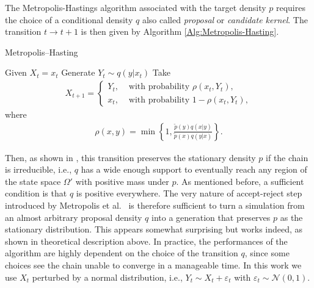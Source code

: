 \documentclass[11pt,a4paper]{article}
\numberwithin{equation}{section}
\begin{document}
The Metropolis-Hastings algorithm associated with the target density $p$ requires the choice of a conditional density $q$ also called {\it proposal} or {\it candidate kernel}.  
%
The transition $t\to t+1$ is then given by Algorithm \ref{Alg:Metropolis-Hasting}.
\begin{algorithm}
	\caption{Metropolis--Hasting}
	\label{Alg:Metropolis-Hasting}
	\begin{algorithmic}[1]
		\State Given $X_t = x_t$
		\State Generate $Y_t\sim q(y | x_t)$
		\State Take 
		\begin{align*}
		X_{t+1}=\left\lbrace 
		\begin{aligned}
		Y_t, &\text{ with probability } \rho(x_t,Y_t),\\
		x_t, &\text{ with probability } 1- \rho(x_t,Y_t),
		\end{aligned}
		\right.
		\end{align*}
		where 
		\begin{align*}
		\rho(x,y) = \min\left\lbrace 1, \frac{\tilde{p}(y)q(x|y)}{\tilde{p}(x)q(y|x)}\right\rbrace.
		\end{align*}
		\EndProcedure
	\end{algorithmic}
\end{algorithm}


Then, as shown in \cite{metropolis1953equation}, this transition preserves the stationary density $p$ if the chain is irreducible, i.e., $q$ has a wide enough support to eventually reach any region of the state space $\Omega'$ with positive mass under $p$. 
%
As mentioned before, a sufficient condition is that $q$ is positive everywhere. 
%
The very nature of accept-reject step introduced by Metropolis et al.~\cite{metropolis1953equation} is therefore sufficient to turn a simulation from an almost arbitrary proposal density $q$ into a generation that preserves $p$ as the stationary distribution. 
%
This appears somewhat surprising but works indeed, as shown in theoretical description above.
%
In practice, the performances of the algorithm are highly dependent on the choice of the transition $q$, since some choices see the chain unable to converge in a manageable time.
%
In this work we use $X_t$ perturbed by a normal distribution, i.e., $Y_t\sim X_t+\varepsilon_t$ with $\varepsilon_t\sim \mathcal{N}(0,1)$.
\end{document}
